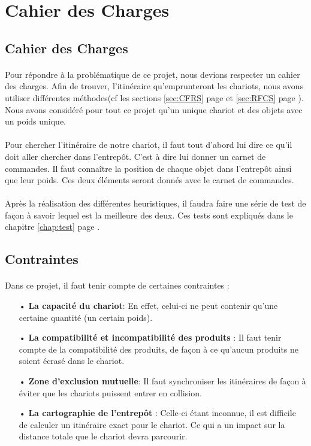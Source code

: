 \documentclass[twoside,UTF8]{EPURapport}
\begin{document}
\section{Cahier des Charges}
\subsection{Cahier des Charges}
\paragraph{}Pour répondre à la problématique de ce projet, nous devions respecter un cahier des charges. Afin de trouver, l'itinéraire qu'emprunteront les chariots, nous avons utiliser différentes méthodes(cf les sections \ref{sec:CFRS} page \pageref{sec:CFRS} et \ref{sec:RFCS} page \pageref{sec:RFCS}). Nous avons considéré pour tout ce projet qu'un unique chariot et des objets avec un poids unique. 

\paragraph{}Pour chercher l'itinéraire de notre chariot, il faut tout d'abord lui dire ce qu'il doit aller chercher dans l'entrepôt. C'est à dire lui donner un carnet de commandes. Il faut connaître la position de chaque objet dans l'entrepôt ainsi que leur poids. Ces deux éléments seront donnés avec le carnet de commandes.

\paragraph{}Après la réalisation des différentes heuristiques, il faudra faire une série de test de façon à savoir lequel est la meilleure des deux. Ces tests sont expliqués dans le chapitre \ref{chap:test} page \pageref{chap:test}.

\subsection{Contraintes}
\label{sec:Contraintes}
\paragraph{}Dans ce projet, il faut tenir compte de certaines contraintes : 
\begin{itemize}
\item[•]\textbf{La capacité du chariot}: En effet, celui-ci ne peut contenir qu'une certaine quantité (un certain poids).
\item[•]\textbf{La compatibilité et incompatibilité des produits} : Il faut tenir compte de la compatibilité des produits, de façon à ce qu'aucun produits ne soient écrasé dans le chariot.
\item[•]\textbf{Zone d'exclusion mutuelle}: Il faut synchroniser les itinéraires de façon à éviter que les chariots puissent entrer en collision. 
\item[•]\textbf{La cartographie de l'entrepôt} : Celle-ci étant inconnue, il est difficile de calculer un itinéraire exact pour le chariot. Ce qui a un impact sur la distance totale que le chariot devra parcourir.
\end{itemize} 
\end{document}
